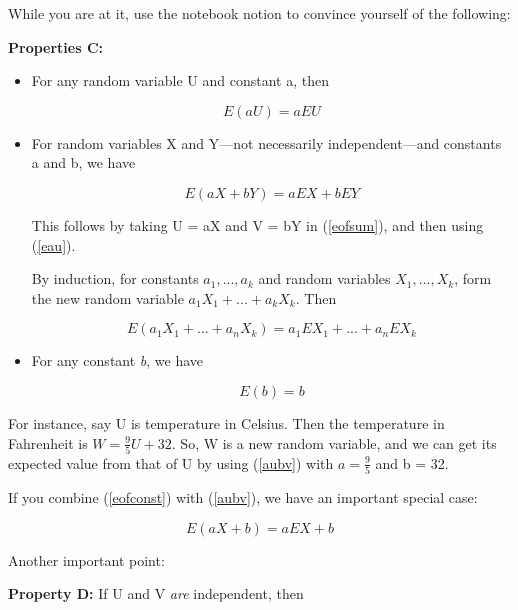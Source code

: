 While you are at it, use the notebook notion to convince yourself of the
following:

{\bf Properties C:}  

\begin{itemize}

\item For any random variable U and constant a, then

\begin{equation}
\label{eau}
E(aU) = a EU
\end{equation}

\item For random variables X and Y---not necessarily independent---and
constants a and b, we have

\begin{equation}
\label{aubv}
E(aX+bY) = a EX + b EY
\end{equation}

This follows by taking U = aX and V = bY in (\ref{eofsum}), and then
using (\ref{eau}).

By induction, for constants $a_1,...,a_k$ and random variables
$X_1,...,X_k$, form the new random variable 
$a_1 X_1 +...+ a_k X_k$.  Then

\begin{equation}
\label{elincomb}
E(a_1 X_1 +...+ a_n X_k) = 
a_1 EX_1 +...+ a_n EX_k
\end{equation}

\item For any constant {\it b}, we have

\begin{equation}
\label{eofconst}
E(b) = b
\end{equation}

\end{itemize}

For instance, say U is temperature in Celsius.  Then the temperature in
Fahrenheit is $W = \frac{9}{5} U + 32$.  So, W is a new random variable,
and we can get its expected value from that of U by using (\ref{aubv})
with $a = \frac{9}{5}$ and b = 32.

If you combine (\ref{eofconst}) with (\ref{aubv}), we have an important
special case:

\begin{equation}
\label{aub}
E(aX+b) = a EX + b
\end{equation}

Another important point:

{\bf Property D:} If U and V {\it are} independent, then


